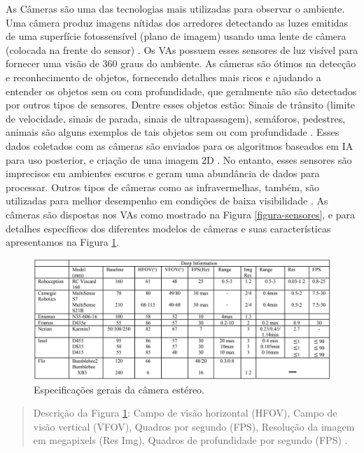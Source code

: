  \label{camera}
As Câmeras são uma das tecnologias mais utilizadas para observar o ambiente. Uma câmera produz imagens nítidas dos arredores detectando as luzes emitidas de uma superfície fotossensível (plano de imagem) usando uma lente de câmera (colocada na frente do sensor) \cite{sensors}. Os VAs possuem esses sensores de luz visível para fornecer uma visão de 360 graus do ambiente. As câmeras são ótimos na detecção e reconhecimento de objetos, fornecendo detalhes mais ricos e ajudando a entender os objetos sem ou com profundidade, que geralmente não são detectados por outros tipos de sensores. Dentre esses objetos estão: Sinais de trânsito (limite de velocidade, sinais de parada, sinais de ultrapassagem), semáforos, pedestres, animais são alguns exemplos de tais objetos sem ou com profundidade \cite{sensors-yet}. Esses dados coletados com as câmeras são enviados para os algoritmos baseados em IA para uso posterior, e criação de uma imagem 2D \cite{aplicacao2}. 
No entanto, esses sensores são imprecisos em ambientes escuros e geram uma abundância de dados para processar. Outros tipos de câmeras como as infravermelhas, também, são utilizadas para melhor desempenho em condições de baixa visibilidade \cite{review-auto}. As câmeras são dispostas nos VAs como mostrado na Figura \ref{figura-sensores}, e para detalhes específicos dos diferentes modelos de câmeras e suas características apresentamos na Figura \ref{tabela-camera}.
\begin{figure}[H]
\centering
\includegraphics[width=\textwidth]{Figures/camera-table.png}
\caption{Especificações gerais da câmera estéreo.}
\label{tabela-camera}
\end{figure}
\begin{quote}
Descrição da Figura \ref{tabela-camera}: Campo de visão horizontal (HFOV), Campo de visão vertical (VFOV), Quadros por segundo (FPS), Resolução da imagem em megapixels (Res Img), Quadros de profundidade por segundo (FPS) \cite{sensors}.
\end{quote}

